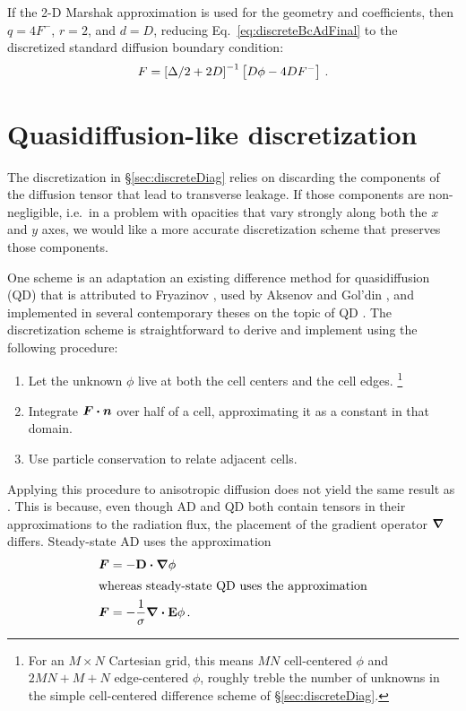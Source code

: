 If the 2-D Marshak approximation is used for the geometry and coefficients, then
$q=4F^-$, $r=2$, and $d=D$, reducing Eq.~\eqref{eq:discreteBcAdFinal} to the
discretized standard diffusion boundary condition:
\begin{equation*}
  F = \left[ \Delta/2 + 2D \right]^{-1} \left[ D\phi - 4DF^-  \right] \,.
\end{equation*}

\section{Quasidiffusion-like discretization}

The discretization in \S\ref{sec:discreteDiag} relies on discarding the
components of the diffusion tensor that lead to transverse leakage. If those
components are non-negligible, i.e.~in a problem with opacities
that vary strongly along both the $x$ and $y$ axes, we would like a
more accurate discretization scheme that preserves those components.

One scheme is an adaptation an existing difference method for quasidiffusion
(QD) that is attributed to Fryazinov \cite{Fry1976}, used by Aksenov and Gol'din
\cite{Aks1979}, and implemented in several contemporary theses on the topic of
QD \cite{Val2002,Wie2009}. The discretization scheme is straightforward to
derive and implement using the following procedure:
\begin{enumerate}
  \item Let the unknown $\phi$ live at both the cell centers and the
  cell edges.%
  \footnote{%
  For an $M\times N$ Cartesian grid, this means $MN$
  cell-centered $\phi$ and $2MN + M + N$ edge-centered $\phi$, roughly treble
  the number of unknowns in the simple cell-centered difference scheme of
  \S\ref{sec:discreteDiag}.%
  }
  \item Integrate $\bm{F}\bm{\cdot} \bm{n}$ over half of a cell, approximating
  it as a constant in that domain.
  \item Use particle conservation to relate adjacent cells.
\end{enumerate}

Applying this procedure to anisotropic diffusion does not yield the same result
as \cite{Val2002}. This is because, even though AD and QD both contain tensors
in their approximations to the radiation flux, the placement of the gradient
operator $\bm{\nabla}$ differs. Steady-state AD uses the approximation
\begin{align*}
  \bm{F} &= - \mathbf{D} \bm{\cdot} \bm{\nabla} \phi
  \\ 
  \intertext{whereas steady-state QD uses the approximation}
  \bm{F} &= - \frac{1}{\sigma} \bm{\nabla} \bm{\cdot} \mathbf{E} \phi\,.
\end{align*}

